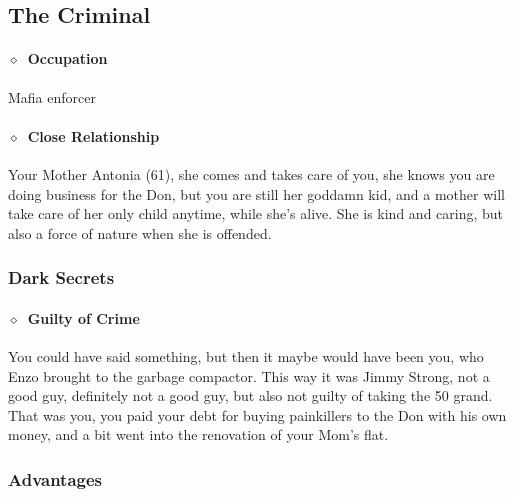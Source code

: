 \clearpage %
\subsection{The Criminal}%
\label{sub:the_criminal}
\paragraph{\(\diamond\)~Occupation}%
Mafia enforcer
\paragraph{\(\diamond\)~Close Relationship}%
Your Mother Antonia (61), she comes and takes care of you, she knows you are doing business for the Don, but you are still her
goddamn kid, and a mother will take care of her only child anytime, while she's alive. She is kind and caring, but also a force
of nature when she is offended.


\subsubsection{Dark Secrets}%
\label{ssub:criminal_dark_secrets}

\paragraph{\(\diamond\)~Guilty of Crime}%
You could have said something, but then it maybe would have been you, who Enzo brought to the garbage compactor.
This way it was Jimmy Strong, not a good guy, definitely not a good guy, but also not guilty of taking the 50 grand.
That was you, you paid your debt for buying painkillers to the Don with his own money, and a bit went into the renovation of
your Mom's flat.

\subsubsection{Advantages}%
\label{ssub:criminal_advantages}

